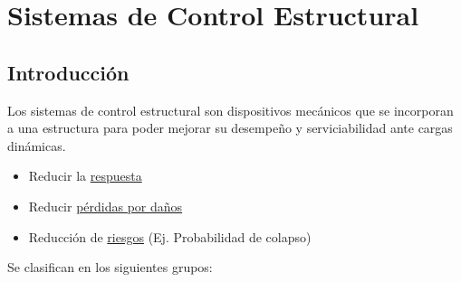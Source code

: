 \chapter{Sistemas de Control Estructural}


%

\section{Introducción}
Los sistemas de control estructural son dispositivos mecánicos que se incorporan a una estructura para poder mejorar su desempeño y serviciabilidad ante cargas dinámicas.

\begin{itemize}
    \item Reducir la \underline{respuesta}
    \item Reducir \underline{pérdidas por daños}
    \item Reducción de \underline{riesgos} (Ej. Probabilidad de colapso)
\end{itemize}

\vspace{1eX}

Se clasifican en los siguientes grupos:

